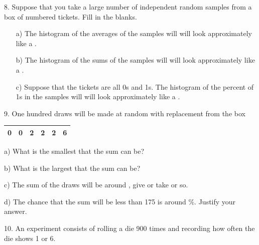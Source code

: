 \documentclass[10pt]{article}
\begin{document}
8.
Suppose that you take a large number of independent random samples from a box of numbered
tickets.
Fill in the blanks.

\begin{itemize}
\item[a)] The histogram of the averages of the samples will
  will look approximately like a \underbar{\hspace{1.2in}}.\vspace{.2in}
\item[b)] The histogram of the sums of the  samples will
  will look approximately like a \underbar{\hspace{1.2in}}.\vspace{.2in}
  
\item[c)] Suppose that the tickets are all 0s and 1s.  The histogram of the
  percent of 1s in the  samples will
  will look approximately like a \underbar{\hspace{1.2in}}.
\end{itemize}
\medskip

9.  One hundred draws will be made at random with replacement from
the box
\begin{center}
\begin{tabular}{|cccccc|}
0 &0 & 2 & 2 & 2 & 6\\\hline
\end{tabular}
\end{center}

\hspace{10pt} a) What is the smallest that the sum can be?
\vspace{.5in}

\hspace{10pt} b) What is the largest that the sum can be?
\vspace{.5in}

\hspace{10pt} c) The sum of the draws will be around \underline{\hspace{1in}},
give or take \underline{\hspace{1in}} or so.  %
\vspace{1in}

\hspace{10pt} d) The chance that the sum will be less than 175 is around
\underline{\hspace{1in}} \%.  Justify your answer.


\vfill
\eject

10.  An experiment consists of rolling a die 900 times and recording how often
the die shows 1 or 6.
\end{document}
